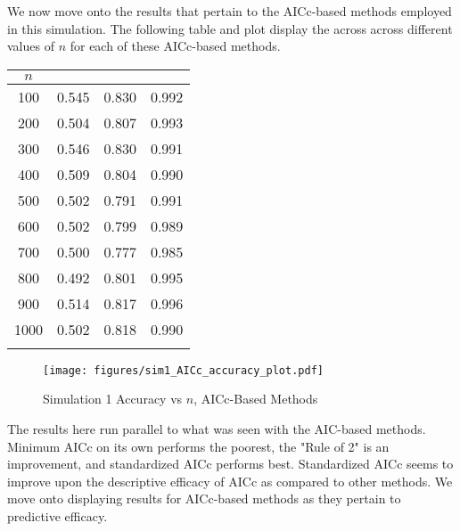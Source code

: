 		We now move onto the results that pertain to the AICc-based methods employed in this simulation. The following table and plot display the across across different values
		of $n$ for each of these AICc-based methods. 

		\begin{table}[H]
			\centering
			\small\addtolength{\tabcolsep}{-3pt}
			\setlength\extrarowheight{-3pt}
			{
			\begin{tabular}{ c|c|c|c}
			$n$ & \vtop{\hbox{\strut Minimum AICc}\hbox{\strut Accuracy}} & \vtop{\hbox{\strut AICc Rule of 2}\hbox{\strut Accuracy}} & \vtop{\hbox{\strut Standardized AICc}\hbox{\strut Accuracy}} \\
			 \hline
			 100 & 0.545  &  0.830 &  0.992 \\
			 200 & 0.504  &  0.807 &  0.993 \\
			 300 & 0.546  &  0.830 &  0.991 \\
			 400 & 0.509  &  0.804 &  0.990 \\
			 500 & 0.502  &  0.791 &  0.991 \\
			 600 & 0.502  &  0.799 &  0.989 \\
			 700 & 0.500  &  0.777 &  0.985 \\
			 800 & 0.492  &  0.801 &  0.995 \\
			 900 & 0.514  &  0.817 &  0.996 \\
			 1000 &  0.502  &  0.818 &  0.990 \\
			 \Xhline{3\arrayrulewidth}
			\end{tabular}
			}
		\end{table}

		\begin{figure}[H]
			\centering
			\captionsetup{justification=centering}
			\texttt{[image: figures/sim1\_AICc\_accuracy\_plot.pdf]}
			\caption{\label{fig:sim1_aicc_accuracy_plot} Simulation 1 Accuracy vs $n$, AICc-Based Methods}
		\end{figure}

		The results here run parallel to what was seen with the AIC-based methods. Minimum AICc on its own performs the poorest, the "Rule of 2" is an improvement, and standardized
		AICc performs best. Standardized AICc seems to improve upon the descriptive efficacy of AICc as compared to other methods. We move onto displaying results for AICc-based
		methods as they pertain to predictive efficacy. 

